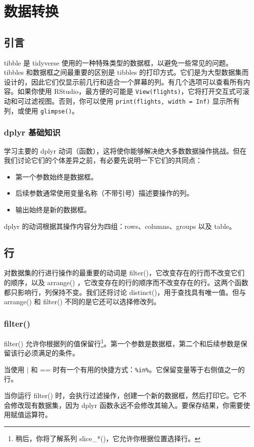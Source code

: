 \chapter{数据转换\label{ch03}}
\section{引言}
tibble 是 tidyverse 使用的一种特殊类型的数据框，以避免一些常见的问题。tibbles 和数据框之间最重要的区别是 tibbles 的打印方式。它们是为大型数据集而设计的，因此它们仅显示前几行和适合一个屏幕的列。有几个选项可以查看所有内容。如果你使用 RStudio，最方便的可能是 \verb|View(flights)|，它将打开交互式可滚动和可过滤视图。否则，你可以使用 \verb|print(flights, width = Inf)| 显示所有列，或使用 \verb|glimpse()|。
\subsection{dplyr 基础知识}
学习主要的 dplyr 动词（函数），这将使你能够解决绝大多数数据操作挑战。但在我们讨论它们的个体差异之前，有必要先说明一下它们的共同点：
\begin{itemize}
    \item 第一个参数始终是数据框。
    \item 后续参数通常使用变量名称（不带引号）描述要操作的列。
    \item 输出始终是新的数据框。
\end{itemize}

dplyr 的动词根据其操作内容分为四组：rows、columns、groups 以及 table。
\section{行}
对数据集的行进行操作的最重要的动词是 filter()，它改变存在的行而不改变它们的顺序，以及 arrange() ，它改变存在的行的顺序而不改变存在的行。这两个函数都只影响行，列保持不变。我们还将讨论 distinct()，用于查找具有唯一值。但与 arrange() 和 filter() 不同的是它还可以选择修改列。
\subsection{filter()}
filter() 允许你根据列的值保留行\footnote{稍后，你将了解系列 slice\_*()，它允许你根据位置选择行。}。第一个参数是数据框，第二个和后续参数是保留该行必须满足的条件。

当使用 $|$ 和 == 时有一个有用的快捷方式：\verb|%in%|。它保留变量等于右侧值之一的行。

当你运行 filter() 时，会执行过滤操作，创建一个新的数据框，然后打印它。它不会修改现有数据集，因为 dplyr 函数永远不会修改其输入。要保存结果，你需要使用赋值运算符。
